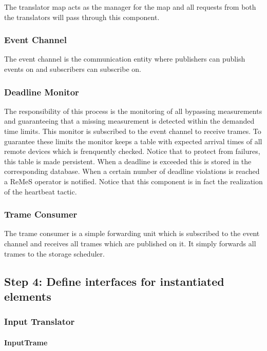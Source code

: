 \npar The translator map acts as the manager for the map and all requests from
both the translators will pass through this component. 

\subsubsection{Event Channel}

\npar The event channel is the communication entity where publishers can publish
events on and subscribers can subscribe on.

\subsubsection{Deadline Monitor}

\npar The responsibility of this process is the monitoring of all bypassing
measurements and guaranteeing that a missing measurement is detected within the
demanded time limits. This monitor is subscribed to the event channel to receive
trames. To guarantee these limits the monitor keeps a table with expected
arrival times of all remote devices which is frenquently checked. Notice that to
protect from failures, this table is made persistent. When a deadline is
exceeded this is stored in the corresponding database. When a certain number of
deadline violations is reached a ReMeS operator is notified. Notice that this
component is in fact the realization of the heartbeat tactic. 

\subsubsection{Trame Consumer}

\npar The trame consumer is a simple forwarding unit which is subscribed to the
event channel and receives all trames which are published on it. It simply
forwards all trames to the storage scheduler.

\subsection{Step 4: Define interfaces for instantiated elements}
\label{add:it2/interfaces}

\subsubsection{Input Translator}

\paragraph{InputTrame}

